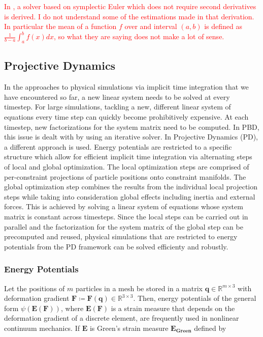 \documentclass{article}
\begin{document}
\textcolor{red}{
    In \cite{servin2006}, a solver based on symplectic Euler which does not require second derivatives is derived. I do not understand some of the
    estimations made in that derivation. In particular the mean of a function $f$ over and interval $(a, b)$ is defined as $\frac{1}{b-a}
    \int_a^b f(x) dx$, so what they are saying does not make a lot of sense.}


\subsection*{Projective Dynamics}

In the approaches to physical simulations via implicit time integration that we have encountered so far, a new linear system needs to be solved
at every timestep. For large simulations, tackling a new, different linear system of equations every time step can quickly become prohibitively 
expensive. At each timestep, new factorizations for the system matrix need to be computed. In PBD, this issue is dealt with by using an iterative 
solver. In Projective Dynamics (PD), a different approach is used. Energy potentials are restricted to a specific structure which allow for 
efficient implicit time integration via alternating steps of local and global optimization. The local optimization steps are comprised of 
per-constraint projections of particle positions onto constraint manifolds. The global optimization step combines the results from the individual 
local projection steps while taking into consideration global effects including inertia and external forces. This is achieved by solving a 
linear system of equations whose system matrix is constant across timesteps. Since the local steps can be carried out in parallel and the 
factorization for the system matrix of the global step can be precomputed and reused, physical simulations that are restricted to energy potentials 
from the PD framework can be solved efficienty and robustly.

\subsubsection*{Energy Potentials}

Let the positions of $m$ particles in a mesh be stored in a matrix $\bm{q} \in \mathbb{R}^{m \times 3}$ with deformation gradient $\bm{F} 
\coloneqq \bm{F(\bm{q})} \in \mathbb{R}^{3 \times 3}$. Then, energy potentials of the general form $\psi(\bm{E}(\bm{F}))$, where 
$\bm{E}(\bm{F})$ is a strain measure that depends on the deformation gradient of a discrete element, are frequently used in nonlinear 
continuum mechanics. If $\bm{E}$ is Green's strain measure $\bm{E_{\text{Green}}}$ defined by 
\end{document}
